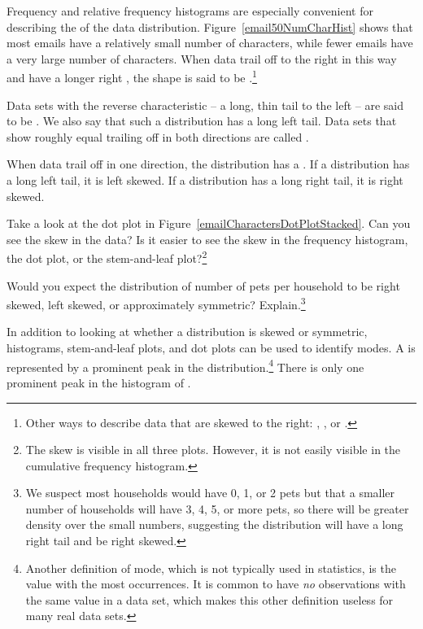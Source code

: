 Frequency and relative frequency histograms are especially convenient for describing the  of the data distribution\label{shapeFirstDiscussed}. Figure~\ref{email50NumCharHist} shows that most emails have a relatively small number of characters, while fewer emails have a very large number of characters. When data trail off to the right in this way and have a longer right , the shape is said to be .\footnote{Other ways to describe data that are skewed to the right: , , or .}

Data sets with the reverse characteristic -- a long, thin tail to the left -- are said to be . We also say that such a distribution has a long left tail. Data sets that show roughly equal trailing off in both directions are called .

\begin{termBox}{
When data trail off in one direction, the distribution has a .  If a distribution has a long left tail, it is left skewed. If a distribution has a long right tail, it is right skewed.}
\end{termBox}

\begin{exercise}
Take a look at the dot plot in Figure~\ref{emailCharactersDotPlotStacked}. Can you see the skew in the data? Is it easier to see the skew in the frequency histogram, the dot plot, or the stem-and-leaf plot?\footnote{The skew is visible in all three plots. However, it is not easily visible in the cumulative frequency histogram.}
\end{exercise}

\begin{exercise}
Would you expect the distribution of number of pets per household to be right skewed, left skewed, or approximately symmetric?  Explain.\footnote{We suspect most households would have 0, 1, or 2 pets but that a smaller number of households will have 3, 4, 5, or more pets, so there will be greater density over the small numbers, suggesting the distribution will have a long right tail and be right skewed.}
\end{exercise}

In addition to looking at whether a distribution is skewed or symmetric, histograms, stem-and-leaf plots, and dot plots can be used to identify modes. A  is represented by a prominent peak in the distribution.\footnote{Another definition of mode, which is not typically used in statistics, is the value with the most occurrences. It is common to have \emph{no} observations with the same value in a data set, which makes this other definition useless for many real data sets.} There is only one prominent peak in the histogram of .

